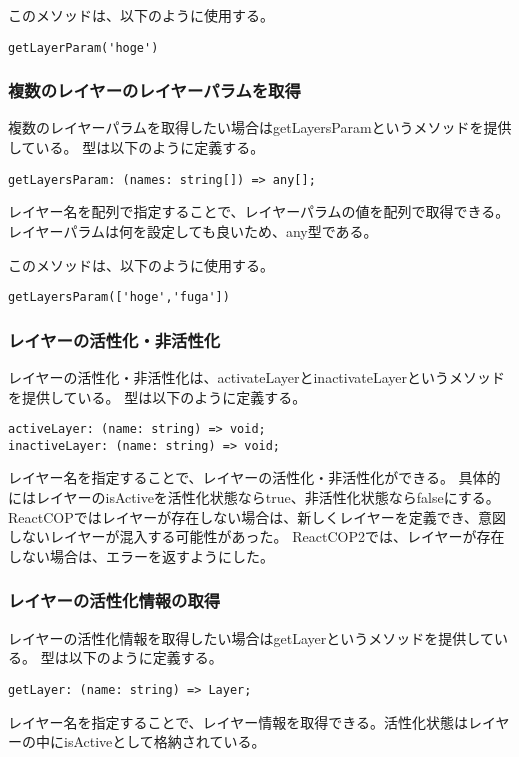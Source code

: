 \documentclass{jsarticle}
\begin{document}
このメソッドは、以下のように使用する。
\begin{lstlisting}[]
getLayerParam('hoge')
\end{lstlisting}

\subsubsection{複数のレイヤーのレイヤーパラムを取得}
複数のレイヤーパラムを取得したい場合はgetLayersParamというメソッドを提供している。
型は以下のように定義する。
\begin{lstlisting}[caption=getLayersParamの型]
getLayersParam: (names: string[]) => any[];
\end{lstlisting}
レイヤー名を配列で指定することで、レイヤーパラムの値を配列で取得できる。
レイヤーパラムは何を設定しても良いため、any型である。

このメソッドは、以下のように使用する。
\begin{lstlisting}[]
getLayersParam(['hoge','fuga'])
\end{lstlisting}

\subsubsection{レイヤーの活性化・非活性化}
レイヤーの活性化・非活性化は、activateLayerとinactivateLayerというメソッドを提供している。
型は以下のように定義する。
\begin{lstlisting}[caption=activateLayerとinactivateLayerの型]
activeLayer: (name: string) => void; 
inactiveLayer: (name: string) => void;
\end{lstlisting}
レイヤー名を指定することで、レイヤーの活性化・非活性化ができる。
具体的にはレイヤーのisActiveを活性化状態ならtrue、非活性化状態ならfalseにする。
ReactCOPではレイヤーが存在しない場合は、新しくレイヤーを定義でき、意図しないレイヤーが混入する可能性があった。
ReactCOP2では、レイヤーが存在しない場合は、エラーを返すようにした。

\subsubsection{レイヤーの活性化情報の取得}
レイヤーの活性化情報を取得したい場合はgetLayerというメソッドを提供している。
型は以下のように定義する。
\begin{lstlisting}[caption=getLayerの型]
getLayer: (name: string) => Layer;
\end{lstlisting}
レイヤー名を指定することで、レイヤー情報を取得できる。活性化状態はレイヤーの中にisActiveとして格納されている。
\end{document}
